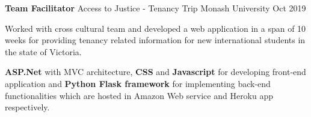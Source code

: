 

\begin{cventries}

\cventry
    {\textbf{Team Facilitator}} %
    {Access to Justice - Tenancy Trip} %
    {Monash University} %
    {Oct 2019} %
    {
      \begin{cvitems} %
        \normalsize{\item {Worked with cross cultural team and developed a web application in a span of 10 weeks for providing tenancy related information for new international students in the state of Victoria.}
        \item{\textbf{ASP.Net} with MVC architecture, \textbf{CSS} and \textbf{Javascript} for developing front-end application and \textbf{Python Flask framework} for implementing back-end functionalities which are hosted in Amazon Web service and Heroku app respectively.}}
      \end{cvitems}
    }


\end{cventries}
